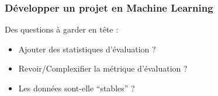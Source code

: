 \begin{frame}
  \frametitle{Développer un projet en Machine Learning}
  Des questions à garder en tête :
  \begin{itemize}
  \item Ajouter des statistiques d'évaluation ?
  \item Revoir/Complexifier la métrique d'évaluation ?
  \item Les données sont-elle ``stables'' ?
  \end{itemize}
\end{frame}
